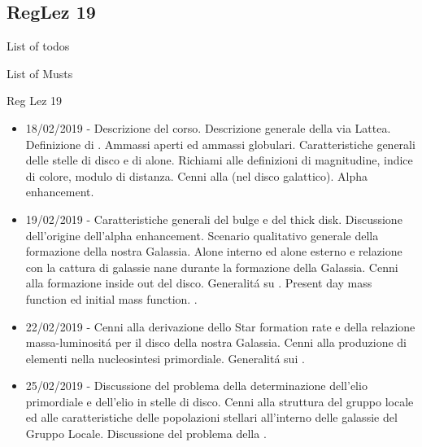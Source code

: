 \subsection{RegLez 19}

\begin{frame}[allowframebreaks]{List of todos}
\listoftodos
\end{frame}


\begin{frame}[allowframebreaks]{List of Musts}
 \listofmusts
\end{frame}

\begin{frame}[allowframebreaks]{Reg Lez 19}
%
\begin{itemize}
\item 18/02/2019 - Descrizione del corso. Descrizione generale della via Lattea. Definizione di . Ammassi aperti ed ammassi globulari. Caratteristiche generali delle stelle di disco e di alone. Richiami alle definizioni di magnitudine, indice di colore, modulo di distanza. Cenni alla  (nel disco galattico). Alpha enhancement. 
\item 19/02/2019 - Caratteristiche generali del bulge e del thick disk. Discussione dell'origine dell'alpha enhancement. Scenario qualitativo generale della formazione della nostra Galassia. Alone interno ed alone esterno e relazione con la cattura di galassie nane durante la formazione della Galassia. Cenni alla formazione inside out del disco. Generalit\'a su . Present day mass function ed initial mass function. . 
\item 22/02/2019 - Cenni alla derivazione dello Star formation rate e della relazione massa-luminosit\'a per il disco della nostra Galassia. Cenni alla produzione di elementi nella nucleosintesi primordiale. Generalit\'a sui . 
\item 25/02/2019 - Discussione del problema della determinazione dell'elio primordiale e dell'elio in stelle di disco. Cenni alla struttura del gruppo locale ed alle caratteristiche delle popolazioni stellari all'interno delle galassie del Gruppo Locale. Discussione del problema della . 

\end{itemize}
\end{frame}
